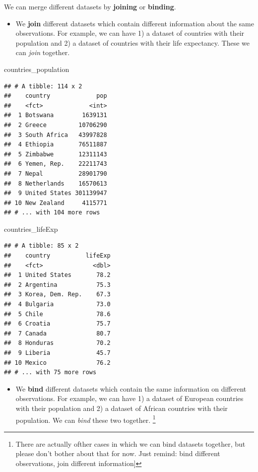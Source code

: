 \documentclass[]{tufte-book}
\newenvironment{Shaded}{}{}
\newcommand{\NormalTok}[1]{#1}
\providecommand{\tightlist}{%
  \setlength{\itemsep}{0pt}\setlength{\parskip}{0pt}}
\begin{document}
We can merge different datasets by \textbf{joining} or \textbf{binding}.

\begin{itemize}
\tightlist
\item
  We \textbf{join} different datasets which contain different information about the same observations. For example, we can have 1) a dataset of countries with their population and 2) a dataset of countries with their life expectancy. These we can \emph{join} together.
\end{itemize}

\begin{Shaded}
\begin{Highlighting}[]
\NormalTok{countries_population}
\end{Highlighting}
\end{Shaded}

\begin{verbatim}
## # A tibble: 114 x 2
##    country             pop
##    <fct>             <int>
##  1 Botswana        1639131
##  2 Greece         10706290
##  3 South Africa   43997828
##  4 Ethiopia       76511887
##  5 Zimbabwe       12311143
##  6 Yemen, Rep.    22211743
##  7 Nepal          28901790
##  8 Netherlands    16570613
##  9 United States 301139947
## 10 New Zealand     4115771
## # ... with 104 more rows
\end{verbatim}

\begin{Shaded}
\begin{Highlighting}[]
\NormalTok{countries_lifeExp}
\end{Highlighting}
\end{Shaded}

\begin{verbatim}
## # A tibble: 85 x 2
##    country          lifeExp
##    <fct>              <dbl>
##  1 United States       78.2
##  2 Argentina           75.3
##  3 Korea, Dem. Rep.    67.3
##  4 Bulgaria            73.0
##  5 Chile               78.6
##  6 Croatia             75.7
##  7 Canada              80.7
##  8 Honduras            70.2
##  9 Liberia             45.7
## 10 Mexico              76.2
## # ... with 75 more rows
\end{verbatim}

\begin{itemize}
\tightlist
\item
  We \textbf{bind} different datasets which contain the same information on different observations. For example, we can have 1) a dataset of European countries with their population and 2) a dataset of African countries with their population. We can \emph{bind} these two together. \footnote{There are actually ofther cases in which we can bind datasets together, but please don't bother about that for now. Just remind: bind different observations, join different information{]}}
\end{itemize}
\end{document}
